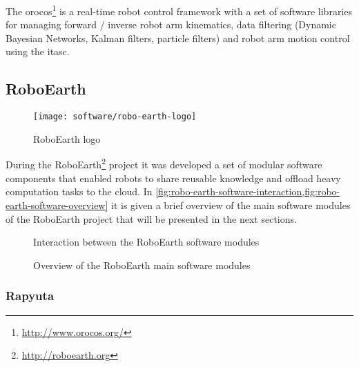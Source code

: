 The \gls{orocos}\footnote{\url{http://www.orocos.org/}} is a real-time robot control framework with a set of software libraries for managing forward / inverse robot arm kinematics, data filtering (Dynamic Bayesian Networks, Kalman filters, particle filters) and robot arm motion control using the \gls{itasc}.




\subsection{RoboEarth}

\begin{wrapfigure}{r}{0.23\textwidth}
	\centering
	\vspace*{-2em}
	\texttt{[image: software/robo-earth-logo]}
	\caption{RoboEarth logo}
	\label{fig:robo-earth-logo}
\end{wrapfigure}

During the RoboEarth\footnote{\url{http://roboearth.org}} project it was developed a set of modular software components that enabled robots to share reusable knowledge and offload heavy computation tasks to the cloud. In \cref{fig:robo-earth-software-interaction,fig:robo-earth-software-overview} it is given a brief overview of the main software modules of the RoboEarth project that will be presented in the next sections.


\begin{figure}[H]
	\begin{floatrow}[2]
		{\caption[Interaction between the RoboEarth software modules]{Interaction between the RoboEarth software modules \cite{DiMarco2013}}\label{fig:robo-earth-software-interaction}}

		{\caption[Overview of the RoboEarth main software modules]{Overview of the RoboEarth main software modules\protect\footnotemark}\label{fig:robo-earth-software-overview}}
	\end{floatrow}
\end{figure}



\subsubsection{Rapyuta}

